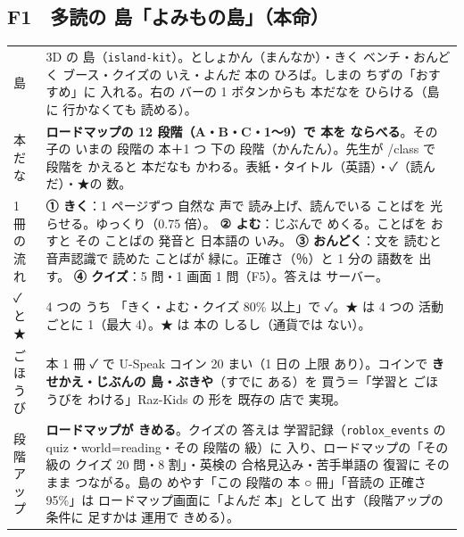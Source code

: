 \documentclass[a4paper,10pt]{article}
\begin{document}
\subsection{F1　多読の 島「よみもの島」（本命）}
\begin{longtable}{@{}L{30mm}L{140mm}@{}}
\toprule
島 & 3D の 島（\texttt{island-kit}）。としょかん（まんなか）・きく ベンチ・おんどく ブース・クイズの いえ・よんだ 本の ひろば。しまの ちずの「おすすめ」に 入れる。右の バーの 1 ボタンからも 本だなを ひらける（島に 行かなくても 読める）。\\
本だな & \textbf{ロードマップの 12 段階（A・B・C・1〜9）で 本を ならべる}。その 子の いまの 段階の 本＋1 つ 下の 段階（かんたん）。先生が /class で 段階を かえると 本だなも かわる。表紙・タイトル（英語）・✓（読んだ）・★の 数。\\
1 冊の 流れ & \textbf{① きく}：1 ページずつ 自然な 声で 読み上げ、読んでいる ことばを 光らせる。ゆっくり（0.75 倍）。\newline
\textbf{② よむ}：じぶんで めくる。ことばを おすと その ことばの 発音と 日本語の いみ。\newline
\textbf{③ おんどく}：文を 読むと 音声認識で 読めた ことばが 緑に。正確さ（％）と 1 分の 語数を 出す。\newline
\textbf{④ クイズ}：5 問・1 画面 1 問（F5）。答えは サーバー。\\
✓ と ★ & 4 つの うち 「きく・よむ・クイズ 80\% 以上」で ✓。★ は 4 つの 活動ごとに 1（最大 4）。★ は 本の しるし（通貨では ない）。\\
ごほうび & 本 1 冊 ✓ で U-Speak コイン 20 まい（1 日の 上限 あり）。コインで \textbf{きせかえ・じぶんの 島・ぶきや}（すでに ある）を 買う＝「学習と ごほうびを わける」Raz-Kids の 形を 既存の 店で 実現。\\
段階アップ & \textbf{ロードマップが きめる}。クイズの 答えは 学習記録（\texttt{roblox\_events} の quiz・world=reading・その 段階の 級）に 入り、ロードマップの「その 級の クイズ 20 問・8 割」・英検の 合格見込み・苦手単語の 復習に そのまま つながる。島の めやす「この 段階の 本 ○ 冊」「音読の 正確さ 95\%」は ロードマップ画面に「よんだ 本」として 出す（段階アップの 条件に 足すかは 運用で きめる）。\\
\bottomrule
\end{longtable}
\end{document}
